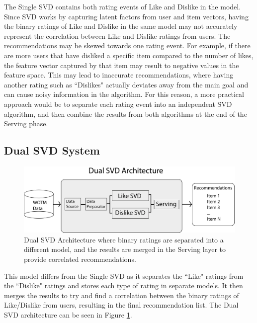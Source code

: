 The Single SVD contains both rating events of Like and Dislike in the model. Since SVD works by capturing latent factors from user and item vectors, having the binary ratings of Like and Dislike in the same model may not accurately represent the correlation between Like and Dislike ratings from users. The recommendations may be skewed towards one rating event. For example, if there are more users that have disliked a specific item compared to the number of likes, the feature vector captured by that item may result to negative values in the feature space. This may lead to inaccurate recommendations, where having another rating such as ``Dislikes" actually deviates away from the main goal and can cause noisy information in the algorithm. For this reason, a more practical approach would be to separate each rating event into an independent SVD algorithm, and then combine the results from both algorithms at the end of the Serving phase. 

\subsection{Dual SVD System} 

\begin{figure}
\centering
\includegraphics[scale=0.5]{recent_images/Dual_ALS_architecture.png}
\caption{Dual SVD Architecture where binary ratings are separated into a different model, and the results are merged in the Serving layer to provide correlated recommendations.}
\label{fig:dual_architecture}
\end{figure}

This model differs from the Single SVD as it separates the ``Like" ratings from the ``Dislike" ratings and stores each type of rating in separate models. It then merges the results to try and find a correlation between the binary ratings of Like/Dislike from users, resulting in the final recommendation list. The Dual SVD architecture can be seen in Figure \ref{fig:dual_architecture}.

